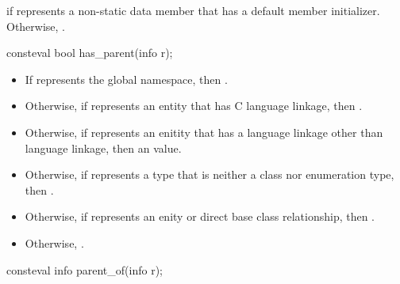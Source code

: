 \begin{itemdescr}
\pnum
\returns
{} if  represents a non-static data member
that has a default member initializer.
Otherwise, .
\end{itemdescr}

%
\begin{itemdecl}
consteval bool has_parent(info r);
\end{itemdecl}

\begin{itemdescr}
\pnum
\returns
\begin{itemize}
\item
  If  represents the global namespace,
  then .
\item
  Otherwise, if  represents an entity that has C language linkage,
  then .
\item
  Otherwise, if  represents an enitity that has a
  language linkage other than \Cpp{} language linkage,
  then an
  value.
\item
  Otherwise, if  represents a type that is neither a class nor enumeration type,
  then .
\item
  Otherwise, if  represents an enity or direct base class relationship,
  then .
\item
  Otherwise, .
\end{itemize}
\end{itemdescr}

%
\begin{itemdecl}
consteval info parent_of(info r);
\end{itemdecl}

